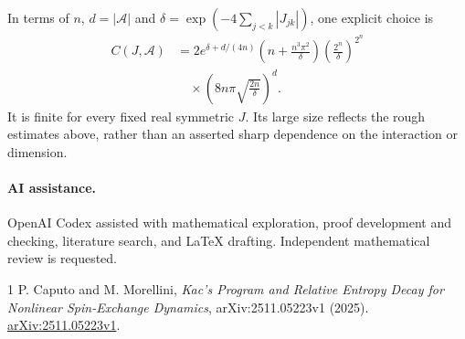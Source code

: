 \documentclass[11pt]{article}
\begin{document}
In terms of $n$, $d=|\mathcal A|$ and
$\delta=\exp(-4\sum_{j<k}|J_{jk}|)$, one explicit choice is
\begin{align*}
 C(J,\mathcal A)
 &=2e^{\delta+d/(4n)}
 \left(n+\frac{n^3\pi^2}{\delta}\right)
 \left(\frac{2^n}{\delta}\right)^{2^n}\\
 &\quad\times\left(8n\pi\sqrt{\frac{2n}{\delta}}\right)^d.
\end{align*}
It is finite for every fixed real symmetric $J$. Its large size reflects the
rough estimates above, rather than an asserted sharp dependence on the
interaction or dimension.
\paragraph{AI assistance.}
OpenAI Codex assisted with mathematical exploration, proof development and
checking, literature search, and LaTeX drafting. Independent mathematical
review is requested.

\begin{thebibliography}{1}
P. Caputo and M. Morellini,
\emph{Kac's Program and Relative Entropy Decay for Nonlinear Spin-Exchange
Dynamics}, arXiv:2511.05223v1 (2025).
\href{https://arxiv.org/abs/2511.05223v1}{arXiv:2511.05223v1}.
\end{thebibliography}
\end{document}

